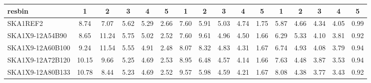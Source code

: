 \begin{table}[H]
{{\begin{tabular}{|lccccc||ccccc||ccccc|}
 resbin  &1 & 2 & 3 & 4 & 5 & 1 & 2 & 3 & 4 & 5 & 1 & 2 & 3 & 4 & 5 \\ \hline
SKA1REF2 & 8.74 \cellcolor{blue!19.77} & 7.07 \cellcolor{red!18.00} & 5.62 \cellcolor{green!49.50} & 5.29 \cellcolor{orange!60.00} & 2.66 \cellcolor{purple!60.00} & 7.60 \cellcolor{blue!18.00} & 5.91 \cellcolor{red!18.00} & 5.03 \cellcolor{green!60.00} & 4.74 \cellcolor{orange!60.00} & 1.75 \cellcolor{purple!60.00} & 5.87 \cellcolor{blue!18.00} & 4.66 \cellcolor{red!30.38} & 4.34 \cellcolor{green!60.00} & 4.05 \cellcolor{orange!60.00} & 0.99 \cellcolor{purple!60.00}\\ \hline 
SKA1X9-12A54B90 & 8.65 \cellcolor{blue!18.00} & 11.24 \cellcolor{red!57.18} & 5.75 \cellcolor{green!60.00} & 5.02 \cellcolor{orange!41.10} & 2.52 \cellcolor{purple!27.33} & 7.60 \cellcolor{blue!18.00} & 9.61 \cellcolor{red!60.00} & 4.96 \cellcolor{green!53.61} & 4.50 \cellcolor{orange!43.20} & 1.66 \cellcolor{purple!18.00} & 6.29 \cellcolor{blue!25.98} & 5.33 \cellcolor{red!60.00} & 4.10 \cellcolor{green!42.32} & 3.81 \cellcolor{orange!43.74} & 0.92 \cellcolor{purple!18.00}\\ \hline 
SKA1X9-12A60B100 & 9.24 \cellcolor{blue!29.63} & 11.54 \cellcolor{red!60.00} & 5.55 \cellcolor{green!43.85} & 4.91 \cellcolor{orange!33.40} & 2.48 \cellcolor{purple!18.00} & 8.07 \cellcolor{blue!28.02} & 8.32 \cellcolor{red!45.36} & 4.83 \cellcolor{green!41.74} & 4.31 \cellcolor{orange!29.90} & 1.67 \cellcolor{purple!22.67} & 6.74 \cellcolor{blue!34.53} & 4.93 \cellcolor{red!42.32} & 4.08 \cellcolor{green!40.84} & 3.79 \cellcolor{orange!42.39} & 0.94 \cellcolor{purple!30.00}\\ \hline 
SKA1X9-12A72B120 & 10.15 \cellcolor{blue!47.58} & 9.66 \cellcolor{red!42.34} & 5.25 \cellcolor{green!19.62} & 4.69 \cellcolor{orange!18.00} & 2.53 \cellcolor{purple!29.67} & 8.95 \cellcolor{blue!46.78} & 6.48 \cellcolor{red!24.47} & 4.57 \cellcolor{green!18.00} & 4.14 \cellcolor{orange!18.00} & 1.66 \cellcolor{purple!18.00} & 7.63 \cellcolor{blue!51.45} & 4.48 \cellcolor{red!22.42} & 3.87 \cellcolor{green!25.37} & 3.53 \cellcolor{orange!24.77} & 0.94 \cellcolor{purple!30.00}\\ \hline 
SKA1X9-12A80B133 & 10.78 \cellcolor{blue!60.00} & 8.44 \cellcolor{red!30.87} & 5.23 \cellcolor{green!18.00} & 4.69 \cellcolor{orange!18.00} & 2.52 \cellcolor{purple!27.33} & 9.57 \cellcolor{blue!60.00} & 5.98 \cellcolor{red!18.79} & 4.59 \cellcolor{green!19.83} & 4.21 \cellcolor{orange!22.90} & 1.67 \cellcolor{purple!22.67} & 8.08 \cellcolor{blue!60.00} & 4.38 \cellcolor{red!18.00} & 3.77 \cellcolor{green!18.00} & 3.43 \cellcolor{orange!18.00} & 0.92 \cellcolor{purple!18.00}\\ \hline 

\end{tabular}}}
\end{table}
